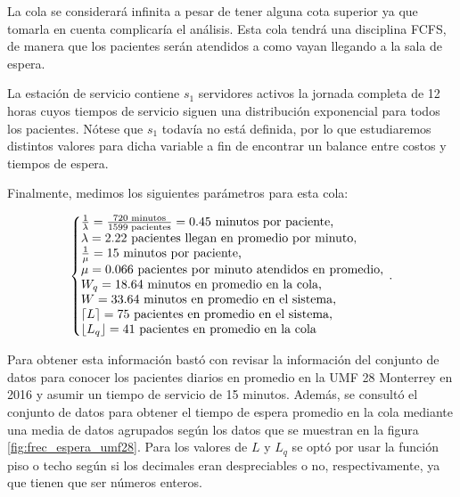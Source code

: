 \documentclass[10pt]{article}
\begin{document}
    La cola se considerará infinita a pesar de tener alguna cota superior ya que tomarla en cuenta complicaría el análisis. Esta cola tendrá una disciplina FCFS, de manera que los pacientes serán atendidos a como vayan llegando a la sala de espera.
    
    La estación de servicio contiene $s_{1}$ servidores activos la jornada completa de 12 horas cuyos tiempos de servicio siguen una distribución exponencial para todos los pacientes. Nótese que $s_{1}$ todavía no está definida, por lo que estudiaremos distintos valores para dicha variable a fin de encontrar un balance entre costos y tiempos de espera.
    
    Finalmente, medimos los siguientes parámetros para esta cola:
    
    \begin{equation*}
    	\left\{
    		\begin{array}{@{}l@{}}
	    		\frac{1}{\lambda} = \frac{720 \text{ minutos}}{1599 \text{ pacientes}} = 0.45 \text{ minutos por paciente,} \\
	    		\lambda = 2.22 \text{ pacientes llegan en promedio por minuto,} \\
	    		\frac{1}{\mu} = 15 \text{ minutos por paciente,} \\
	    		\mu = 0.066 \text{ pacientes por minuto atendidos en promedio,} \\
	    		W_{q} = 18.64 \text{ minutos en promedio en la cola,} \\
	    		W = 33.64 \text{ minutos en promedio en el sistema,} \\
	    		\left\lceil L \right\rceil = 75 \text{ pacientes en promedio en el sistema,} \\
	    		\left\lfloor L_{q} \right\rfloor = 41 \text{ pacientes en promedio en la cola}
    		\end{array}
   		\right.\,.
    \end{equation*}
    
    Para obtener esta información bastó con revisar la información del conjunto de datos \cite{ensat2017} para conocer los pacientes diarios en promedio en la UMF 28 Monterrey en 2016 y asumir un tiempo de servicio de 15 minutos. Además, se consultó el conjunto de datos \cite{ensat2017} para obtener el tiempo de espera promedio en la cola mediante una media de datos agrupados según los datos que se muestran en la figura \ref{fig:frec_espera_umf28}. Para los valores de $L$ y $L_{q}$ se optó por usar la función piso o techo según si los decimales eran despreciables o no, respectivamente, ya que tienen que ser números enteros.
    
\end{document}
